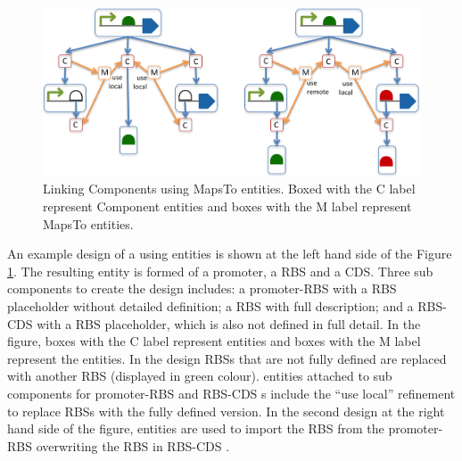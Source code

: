 \begin{figure}[ht]
\begin{center}
\includegraphics[scale=1]{images/MapsTo_Diagram2}
\caption{Linking Components using MapsTo entities. Boxed with the C label represent Component entities and boxes with the M label represent MapsTo entities.}
\label{image:maps_to_diagram2}
\end{center}
\end{figure}

An example design of a  using  entities is shown at the left hand side of the Figure \ref{image:maps_to_diagram2}. The resulting entity is formed of a promoter, a RBS and a CDS. 
Three sub components to create the design includes: a promoter-RBS  with a RBS placeholder without detailed definition; a RBS  with full description; and a RBS-CDS  with a RBS placeholder, which is also not defined in full detail. 
In the figure, boxes with the C label represent  entities and boxes with the M label represent the  entities.
In the design RBSs that are not fully defined are replaced with another RBS  (displayed in green colour).  entities attached to sub components for promoter-RBS and RBS-CDS s include the ``use local'' refinement to replace RBSs with the fully defined version. In the second design at the right hand side of the figure,  entities are used to import the RBS from the promoter-RBS  overwriting the RBS in RBS-CDS . 



